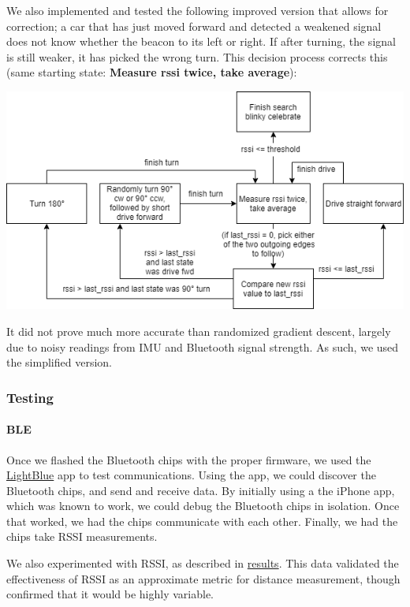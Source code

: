 \documentclass[]{article}
\let\oldparagraph\paragraph
\renewcommand{\paragraph}[1]{\oldparagraph{#1}\mbox{}}
\begin{document}
We also implemented and tested the following improved version that
allows for correction; a car that has just moved forward and detected a
weakened signal does not know whether the beacon to its left or right.
If after turning, the signal is still weaker, it has picked the wrong
turn. This decision process corrects this (same starting state:
\textbf{Measure rssi twice, take average}):

\includegraphics{turn_correction.png}

It did not prove much more accurate than randomized gradient descent,
largely due to noisy readings from IMU and Bluetooth signal strength. As
such, we used the simplified version.

\hypertarget{testing}{%
\subsubsection{Testing}\label{testing}}

\hypertarget{ble-1}{%
\paragraph{BLE}\label{ble-1}}

Once we flashed the Bluetooth chips with the proper firmware, we used
the
\href{https://itunes.apple.com/us/app/lightblue-explorer/id557428110?mt=8}{LightBlue}
app to test communications. Using the app, we could discover the
Bluetooth chips, and send and receive data. By initially using a the
iPhone app, which was known to work, we could debug the Bluetooth chips
in isolation. Once that worked, we had the chips communicate with each
other. Finally, we had the chips take RSSI measurements.

We also experimented with RSSI, as described in
\protect\hyperlink{results}{results}. This data validated the
effectiveness of RSSI as an approximate metric for distance measurement,
though confirmed that it would be highly variable.
\end{document}
